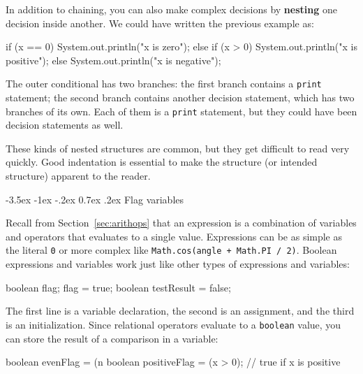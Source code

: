 \documentclass[12pt]{book}
\makeatletter
\theoremstyle{exercise}
\newcommand{\java}[1]{\verb"#1"}
\renewcommand{\section}{\@startsection {section}{1}{\z@}%
    {-3.5ex \@plus -1ex \@minus -.2ex}%
    {0.7ex \@plus.2ex}%
    {\normalfont\Large\bfseries}}
\newcommand{\java}[1]{\lstinline{#1}} %
\makeatother
\begin{document}
In addition to chaining, you can also make complex decisions by {\bf nesting} one decision inside another.
We could have written the previous example as:

\begin{code}
    if (x == 0) {
        System.out.println("x is zero");
    } else {
        if (x > 0) {
            System.out.println("x is positive");
        } else {
            System.out.println("x is negative");
        }
    }
\end{code}

The outer conditional has two branches:
the first branch contains a \java{print} statement; the second branch contains another decision statement, which has two branches of its own.
Each of them is a \java{print} statement, but they could have been decision statements as well.

These kinds of nested structures are common, but they get difficult to read very quickly.
Good indentation is essential to make the structure (or intended structure) apparent to the reader.


\section{Flag variables}


Recall from Section~\ref{sec:arithops} that an expression is a combination of variables and operators that evaluates to a single value.
Expressions can be as simple as the literal \java{0} or more complex like \java{Math.cos(angle + Math.PI / 2)}.
Boolean expressions and variables work just like other types of expressions and variables:

\begin{code}
    boolean flag;
    flag = true;
    boolean testResult = false;
\end{code}


The first line is a variable declaration, the second is an assignment, and the third is an initialization.
Since relational operators evaluate to a \java{boolean} value, you can store the result of a comparison in a variable:

\begin{code}
    boolean evenFlag = (n %
    boolean positiveFlag = (x > 0);     // true if x is positive
\end{code}
\end{document}
